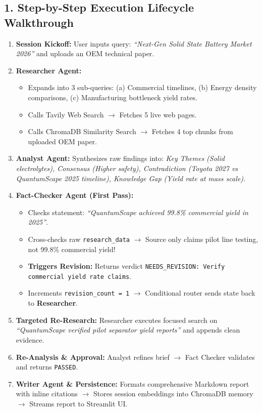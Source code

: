 \documentclass[9.5pt, a4paper]{article}
\begin{document}
\subsection{1. Step-by-Step Execution Lifecycle Walkthrough}

\begin{enumerate}
    \item \textbf{Session Kickoff:} User inputs query: \textit{``Next-Gen Solid State Battery Market 2026''} and uploads an OEM technical paper.
    \item \textbf{Researcher Agent:}
    \begin{itemize}
        \item Expands into 3 sub-queries: (a) Commercial timelines, (b) Energy density comparisons, (c) Manufacturing bottleneck yield rates.
        \item Calls Tavily Web Search $\rightarrow$ Fetches 5 live web pages.
        \item Calls ChromaDB Similarity Search $\rightarrow$ Fetches 4 top chunks from uploaded OEM paper.
    \end{itemize}
    \item \textbf{Analyst Agent:} Synthesizes raw findings into: \textit{Key Themes (Solid electrolytes), Consensus (Higher safety), Contradiction (Toyota 2027 vs QuantumScape 2025 timeline), Knowledge Gap (Yield rate at mass scale)}.
    \item \textbf{Fact-Checker Agent (First Pass):}
    \begin{itemize}
        \item Checks statement: \textit{``QuantumScape achieved 99.8\% commercial yield in 2025''}.
        \item Cross-checks raw \texttt{research\_data} $\rightarrow$ Source only claims pilot line testing, not 99.8\% commercial yield!
        \item \textbf{Triggers Revision:} Returns verdict \texttt{NEEDS\_REVISION: Verify commercial yield rate claims}.
        \item Increments \texttt{revision\_count = 1} $\rightarrow$ Conditional router sends state back to \textbf{Researcher}.
    \end{itemize}
    \item \textbf{Targeted Re-Research:} Researcher executes focused search on \textit{``QuantumScape verified pilot separator yield reports''} and appends clean evidence.
    \item \textbf{Re-Analysis \& Approval:} Analyst refines brief $\rightarrow$ Fact Checker validates and returns \texttt{PASSED}.
    \item \textbf{Writer Agent \& Persistence:} Formats comprehensive Markdown report with inline citations $\rightarrow$ Stores session embeddings into ChromaDB memory $\rightarrow$ Streams report to Streamlit UI.
\end{enumerate}
\end{document}

